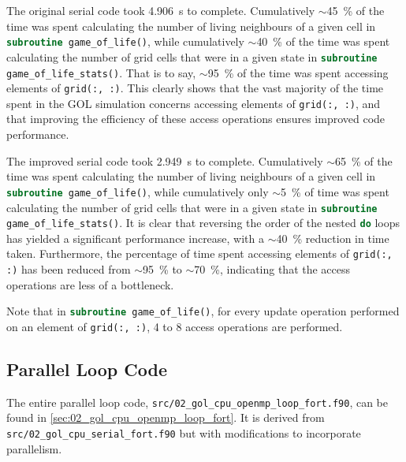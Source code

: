 \documentclass[]{article}
\begin{document}
The original serial code took \SI{4.906}{\second} to complete.
Cumulatively $\sim$\SI{45}{\percent} of the time was spent calculating the
number of living neighbours of a given cell in
\lstinline[language=Fortran]{subroutine game_of_life()},
while cumulatively $\sim$\SI{40}{\percent} of the time was spent calculating the
number of grid cells that were in a given state in
\lstinline[language=Fortran]{subroutine game_of_life_stats()}.
That is to say, $\sim$\SI{95}{\percent} of the time was spent accessing elements
of \lstinline[language=Fortran]{grid(:, :)}.
This clearly shows that the vast majority of the time spent in the GOL
simulation concerns accessing elements of
\lstinline[language=Fortran]{grid(:, :)}, and that improving the efficiency of
these access operations ensures improved code performance.

The improved serial code took \SI{2.949}{\second} to complete.
Cumulatively $\sim$\SI{65}{\percent} of the time was spent calculating the
number of living neighbours of a given cell in
\lstinline[language=Fortran]{subroutine game_of_life()},
while cumulatively only $\sim$\SI{5}{\percent} of time was spent calculating the
number of grid cells that were in a given state in
\lstinline[language=Fortran]{subroutine game_of_life_stats()}.
It is clear that reversing the order of the nested
\lstinline[language=Fortran]{do} loops has yielded a significant performance
increase, with a $\sim$\SI{40}{\percent} reduction in time taken.
Furthermore, the percentage of time spent accessing elements of
\lstinline[language=Fortran]{grid(:, :)} has been reduced from
$\sim$\SI{95}{\percent} to $\sim$\SI{70}{\percent}, indicating that the access
operations are less of a bottleneck.

Note that in \lstinline[language=Fortran]{subroutine game_of_life()},
for every update operation performed on an element of
\lstinline[language=Fortran]{grid(:, :)}, 4 to 8 access operations are
performed.

\subsection{Parallel Loop Code}
\label{sec:parallel-loop-code}

The entire parallel loop code,
\lstinline[style=ff]{src/02_gol_cpu_openmp_loop_fort.f90}, can be found in
\autoref{sec:02_gol_cpu_openmp_loop_fort}.
It is derived from \lstinline[style=ff]{src/02_gol_cpu_serial_fort.f90} but with
modifications to incorporate parallelism.
\end{document}
